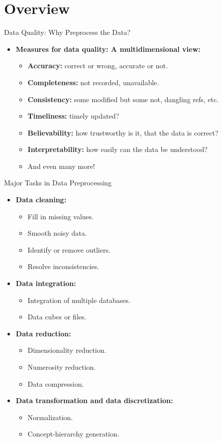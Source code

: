 \section{Overview}

\begin{frame}{Data Quality: Why Preprocess the Data?}
	\begin{itemize}
		\item \textbf{Measures for {\color{airforceblue}data quality}: A 
		multidimensional view:}
		\begin{itemize}
			\item \textbf{Accuracy:} correct or wrong, accurate or not.
			\item \textbf{Completeness:} not recorded, unavailable.
			\item \textbf{Consistency:} some modified but some not, dangling 
			refs, etc.
			\item \textbf{Timeliness:} timely updated?
			\item \textbf{Believability:} how trustworthy is it, that the data 
			is correct?
			\item \textbf{Interpretability:} how easily can the data be 
			understood?
			\item And even many more!
		\end{itemize}
	\end{itemize}
\end{frame}

\begin{frame}{Major Tasks in Data Preprocessing}
	\begin{itemize}
		\item \textbf{Data cleaning:}
		\begin{itemize}
			\item Fill in missing values.
			\item Smooth noisy data.
			\item Identify or remove outliers.
			\item Resolve inconsistencies.
		\end{itemize}
		\item \textbf{Data integration:}
		\begin{itemize}
			\item Integration of multiple databases.
			\item Data cubes or files.
		\end{itemize}
		\item \textbf{Data reduction:}
		\begin{itemize}
			\item Dimensionality reduction.
			\item Numerosity reduction.
			\item Data compression.
		\end{itemize}
		\item \textbf{Data transformation and data discretization:}
		\begin{itemize}
			\item Normalization.
			\item Concept-hierarchy generation.
		\end{itemize}
	\end{itemize}
\end{frame}